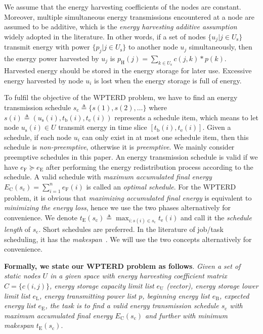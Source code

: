 \documentclass[journal,10pt]{IEEEtran}
\begin{document}
We assume that the energy harvesting coefficients of the nodes are constant. Moreover, multiple simultaneous energy transmissions encountered at a node are assumed to be additive, which is the \textit{energy harvesting additive assumption} widely adopted in the literature\cite{He2013,Dai2017TON,Dai2018TON}. In other words, if a set of nodes $\{u_j|j{\in}U_\text{s}\}$ transmit energy with power $\{p_j|j{\in}U_\text{s}\}$ to another node $u_j$ simultaneously, then the energy power harvested by $u_j$ is $p_\text{H}(j){=}\sum_{k{\in}U_\text{s}}c(j,k){*}p(k)$. Harvested energy should be stored in the energy storage for later use. Excessive energy harvested by node $u_i$ is lost when the energy storage is full of energy.

To fulfil the objective of the WPTERD problem, we have to find an energy transmission schedule $s_\text{c}{\triangleq}\{s(1),s(2),\ldots\}$ where $s(i){\triangleq}(u_\text{s}(i), t_\text{b}(i),t_\text{e}(i))$ represents a schedule item, which means to let node $u_\text{s}(i){\in}U$ transmit energy in time slice $[t_\text{b}(i),t_\text{e}(i)]$. Given a schedule, if each node $u_i$ can only exist in at most one schedule item, then this schedule is \textit{non-preemptive}, otherwise it is \textit{preemptive}. We mainly consider preemptive schedules in this paper. An energy transmission schedule is valid if we have $e_\text{F}{\succeq}e_\text{E}$ after performing the energy redistribution process according to the schedule. A valid schedule with \textit{maximum accumulated final energy} $E_\text{C}(s_\text{c}){=}\sum_{i{=}1}^{n}e_\text{F}(i)$ is called an \textit{optimal schedule}. For the WPTERD problem, it is obvious that \textit{maximizing accumulated final energy} is equivalent to \textit{minimizing the energy loss}, hence we use the two phases alternatively for convenience. We denote $t_\text{E}(s_\text{c}){\triangleq}\max_{i{:}s(i){\in}s_\text{c}}t_\text{e}(i)$ and call it the \textit{schedule length} of $s_\text{c}$. Short schedules are preferred. In the literature of job/task scheduling, it has the \textit{makespan}~\cite{Marx2004}. We will use the two concepts alternatively for convenience.

\textbf{Formally, we state our WPTERD problem as follows}. \textit{Given a set of static nodes $U$ in a given space with energy harvesting coefficient matrix $C{=}\{c(i,j)\}$, energy storage capacity limit list $e_\text{U}$ (vector), energy storage lower limit list $e_\text{L}$, energy transmitting power list $p$, beginning energy list $e_\text{B}$, expected energy list $e_\text{E}$, the task is to find a valid energy transmission schedule $s_\text{c}$ with maximum accumulated final energy $E_\text{C}(s_\text{c})$ and further with minimum makespan $t_\text{E}(s_\text{c})$}.
\end{document}
